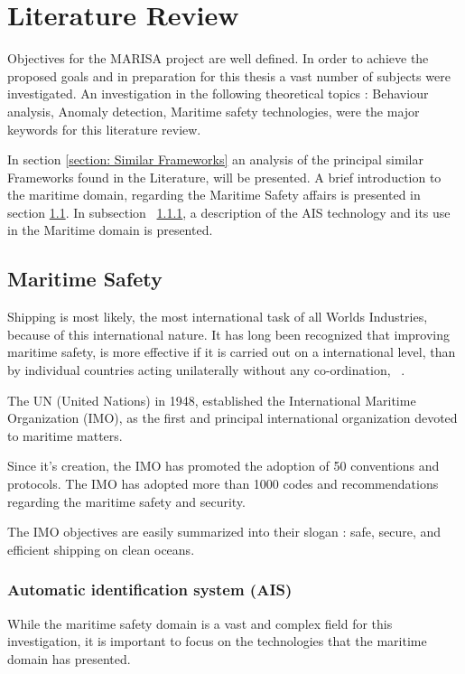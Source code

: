 \chapter{Literature Review}
\label{chapter:literatureReview}

Objectives for the MARISA project are well defined. In order to achieve the proposed goals and in preparation for this thesis a vast number of subjects were investigated. An investigation in the following theoretical topics : Behaviour analysis, Anomaly detection, Maritime safety technologies, were the major keywords for this literature review. 

In section \ref{section: Similar Frameworks} an analysis of the principal similar Frameworks found in the Literature, will be presented.
 A brief introduction to the maritime domain, regarding the Maritime Safety affairs is presented in section \ref{section: Maritime Safety}. In subsection ~\ref{subsection: chp2_AIS}, a description of the AIS technology and its use in the Maritime domain is presented.

\section{Maritime Safety}
\label{section: Maritime Safety}

Shipping is most likely, the most international task of all Worlds Industries, because of this international nature. It has long been recognized that improving maritime safety, is more effective if it is  carried out on a international level, than by individual countries acting unilaterally without any co-ordination, ~\cite{IMO2016}.

The UN (United Nations) in 1948, established the International Maritime Organization (IMO), as the first and principal international organization devoted to maritime matters. 

Since it's creation, the IMO has promoted the adoption of 50 conventions and protocols. The IMO has adopted more than 1000 codes and recommendations regarding the maritime safety and security.

The IMO objectives are easily summarized into their slogan : safe, secure, and efficient shipping on clean oceans.

\subsection{Automatic identification system (AIS)}
\label{subsection: chp2_AIS}
While the maritime safety domain is a vast and complex field for this investigation, it is important to focus on the technologies that the maritime domain has presented.

